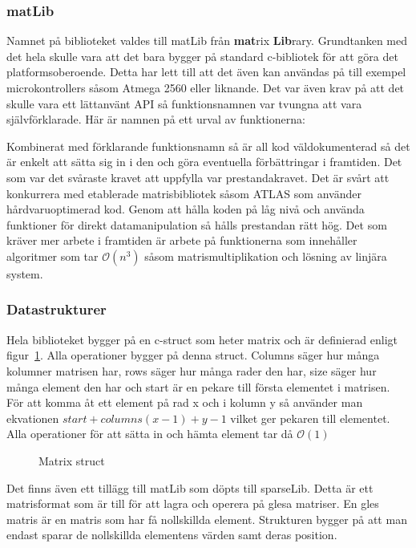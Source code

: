\subsubsection{matLib}
Namnet på biblioteket valdes till matLib från \textbf{mat}rix \textbf{Lib}rary. Grundtanken med det hela skulle vara att det bara bygger på standard c-bibliotek för att göra det platformsoberoende. Detta har lett till att det även kan användas på till exempel microkontrollers såsom Atmega 2560 eller liknande.
Det var även krav på att det skulle vara ett lättanvänt API så funktionsnamnen var tvungna att vara självförklarade. Här är namnen på ett urval av funktionerna:

Kombinerat med förklarande funktionsnamn så är all kod väldokumenterad så det är enkelt att sätta sig in i den och göra eventuella förbättringar i framtiden.
\newline
\newline
Det som var det svåraste kravet att uppfylla var prestandakravet. Det är svårt att konkurrera med etablerade matrisbibliotek såsom ATLAS som använder hårdvaruoptimerad kod. Genom att hålla koden på låg nivå och använda funktioner för direkt datamanipulation så hålls prestandan rätt hög. Det som kräver mer arbete i framtiden är arbete på funktionerna som innehåller algoritmer som tar $\mathcal{O}(n^3)$ såsom matrismultiplikation och lösning av linjära system.



\subsubsection{Datastrukturer}
Hela biblioteket bygger på en c-struct som heter matrix och är definierad enligt figur~\ref{fig:matrix_struct}. Alla operationer bygger på denna struct. Columns säger hur många kolumner matrisen har, rows säger hur många rader den har, size säger hur många element den har och start är en pekare till första elementet i matrisen. För att komma åt ett element på rad x och i kolumn y så använder man ekvationen $start+columns(x-1)+y-1$ vilket ger pekaren till elementet. Alla operationer för att sätta in och hämta element tar då $\mathcal{O}(1)$
\begin{figure}[H]

\caption{Matrix struct}
\label{fig:matrix_struct}
\end{figure}


Det finns även ett tillägg till matLib som döpts till sparseLib. Detta är ett matrisformat som är till för att lagra och operera på glesa matriser. En gles matris är en matris som har få nollskillda element. Strukturen bygger på att man endast sparar de nollskillda elementens värden samt deras position. 

